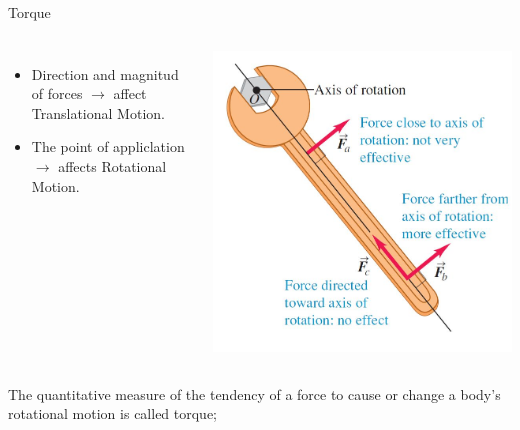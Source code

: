\documentclass[]{beamer}
\begin{document}
\begin{frame}

Torque

\vspace{7mm}

  \begin{columns}[c]
    \column{2in}  %

    \begin{itemize}
      \item Direction and magnitud of forces $\rightarrow$ affect Translational Motion.
      \item The point of appliclation $\rightarrow$ affects Rotational Motion.
    \end{itemize}
   
    \vspace{7mm}


    \column{2in}
 



    
  \begin{center}
    \includegraphics[height=2.in]{images/1.jpg}
  \end{center}

  



    \end{columns}

    \pause

    The quantitative measure of the tendency
    of a force to cause or change a body’s rotational motion is called torque;
    
\end{frame}


\end{document}
